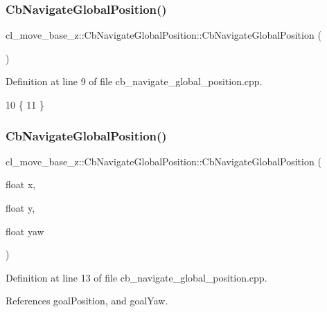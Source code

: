 \subsubsection{\texorpdfstring{Cb\+Navigate\+Global\+Position()}{CbNavigateGlobalPosition()}\hspace{0.1cm}{\footnotesize\ttfamily [1/2]}}
{\footnotesize\ttfamily cl\+\_\+move\+\_\+base\+\_\+z\+::\+Cb\+Navigate\+Global\+Position\+::\+Cb\+Navigate\+Global\+Position (\begin{DoxyParamCaption}{ }\end{DoxyParamCaption})}



Definition at line 9 of file cb\+\_\+navigate\+\_\+global\+\_\+position.\+cpp.


\begin{DoxyCode}
10     \{
11     \}
\end{DoxyCode}
\mbox{\label{classcl__move__base__z_1_1CbNavigateGlobalPosition_a79d42c0eeee48af5e73d917fa2d5b4f5}} 
\subsubsection{\texorpdfstring{Cb\+Navigate\+Global\+Position()}{CbNavigateGlobalPosition()}\hspace{0.1cm}{\footnotesize\ttfamily [2/2]}}
{\footnotesize\ttfamily cl\+\_\+move\+\_\+base\+\_\+z\+::\+Cb\+Navigate\+Global\+Position\+::\+Cb\+Navigate\+Global\+Position (\begin{DoxyParamCaption}\item[{float}]{x,  }\item[{float}]{y,  }\item[{float}]{yaw }\end{DoxyParamCaption})}



Definition at line 13 of file cb\+\_\+navigate\+\_\+global\+\_\+position.\+cpp.



References goal\+Position, and goal\+Yaw.


